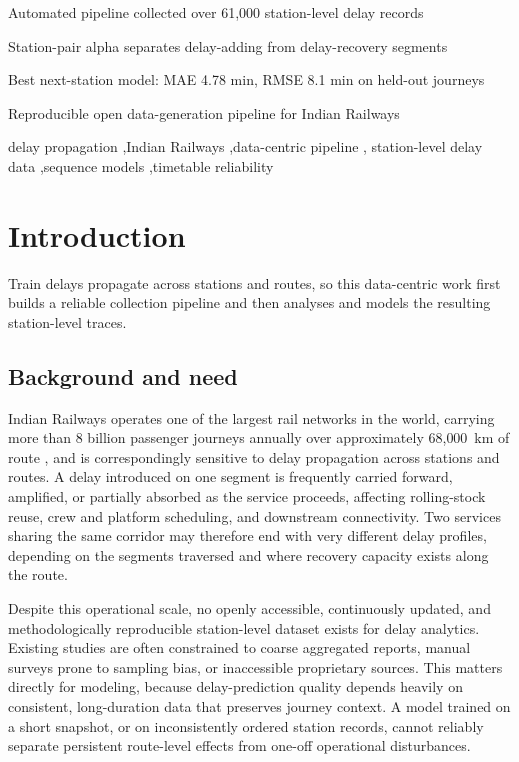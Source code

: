 \documentclass[a4paper,fleqn]{cas-dc}
\begin{document}
\begin{highlights}
\item Automated pipeline collected over 61,000 station-level delay records
\item Station-pair alpha separates delay-adding from delay-recovery segments
\item Best next-station model: MAE 4.78 min, RMSE 8.1 min on held-out journeys
\item Reproducible open data-generation pipeline for Indian Railways
\end{highlights}

\begin{keywords}
delay propagation \sep Indian Railways \sep data-centric pipeline \sep
station-level delay data \sep sequence models \sep timetable reliability
\end{keywords}

\maketitle

\section{Introduction}

Train delays propagate across stations and routes, so this data-centric work
first builds a reliable collection pipeline and then analyses and models the
resulting station-level traces.

\subsection{Background and need}
Indian Railways operates one of the largest rail networks in the world,
carrying more than 8 billion passenger journeys annually over approximately
68{,}000~km of route \citep{indian_railways_stats}, and is correspondingly
sensitive to delay propagation across stations and routes. A delay introduced
on one segment is frequently carried forward, amplified, or partially absorbed
as the service proceeds, affecting rolling-stock reuse, crew and platform
scheduling, and downstream connectivity. Two services sharing the same
corridor may therefore end with very different delay profiles, depending on
the segments traversed and where recovery capacity exists along the route.

Despite this operational scale, no openly accessible, continuously updated,
and methodologically reproducible station-level dataset exists for delay
analytics. Existing studies are often constrained to coarse aggregated
reports, manual surveys prone to sampling bias, or inaccessible proprietary
sources. This matters directly for modeling, because delay-prediction quality
depends heavily on consistent, long-duration data that preserves journey
context. A model trained on a short snapshot, or on inconsistently ordered
station records, cannot reliably separate persistent route-level effects from
one-off operational disturbances.
\end{document}
